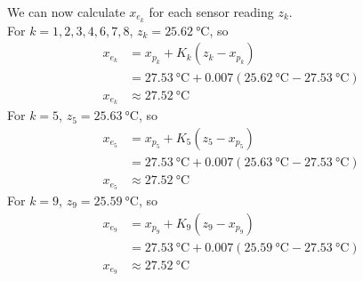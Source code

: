 \documentclass[12pt,a4paper]{article}
\begin{document}
We can now calculate $x_{e_k}$ for each sensor reading $z_k$. \\
For $k=1,2,3,4,6,7,8$, $z_k = \SI{25.62}{\degreeCelsius}$, so
\begin{align*}
    x_{e_k} &= x_{p_k} + K_k (z_k - x_{p_k}) \\
    &= \SI{27.53}{\degreeCelsius} + 0.007 (\SI{25.62}{\degreeCelsius} - \SI{27.53}{\degreeCelsius}) \\
    x_{e_k} &\approx \SI{27.52}{\degreeCelsius}
\end{align*}
For $k=5$, $z_5 = \SI{25.63}{\degreeCelsius}$, so
\begin{align*}
    x_{e_5} &= x_{p_5} + K_5 (z_5 - x_{p_5}) \\
    &= \SI{27.53}{\degreeCelsius} + 0.007 (\SI{25.63}{\degreeCelsius} - \SI{27.53}{\degreeCelsius}) \\
    x_{e_5} &\approx \SI{27.52}{\degreeCelsius}
\end{align*}
For $k=9$, $z_9 = \SI{25.59}{\degreeCelsius}$, so
\begin{align*}
    x_{e_9} &= x_{p_9} + K_9 (z_9 - x_{p_9}) \\
    &= \SI{27.53}{\degreeCelsius} + 0.007 (\SI{25.59}{\degreeCelsius} - \SI{27.53}{\degreeCelsius}) \\
    x_{e_9} &\approx \SI{27.52}{\degreeCelsius}
\end{align*}
\end{document}
